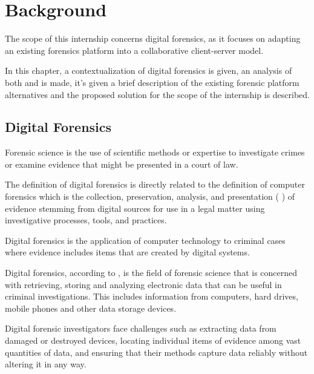 
\chapter{Background}
\label{ch:background}

The scope of this internship concerns digital forensics, as it focuses on adapting an existing forensics platform into a collaborative client-server model.

In this chapter, a contextualization of digital forensics is given, an analysis of both  \cite{sleuthkit} and  \cite{autopsy} is made, it's given a brief description of
the existing forensic platform alternatives and the proposed solution for the scope of the internship is described.

\section{Digital Forensics}

Forensic science is the use of scientific methods or expertise to investigate crimes
or examine evidence that might be presented in a court of law.

The definition of digital forensics is directly related to the definition of
computer forensics which is the collection, preservation, analysis,
and presentation ( \cite{daniels}) of evidence stemming from digital sources for use in a legal matter
using investigative processes, tools, and practices.

Digital forensics is the application of computer technology to criminal cases where evidence
includes items that are created by digital systems.

Digital forensics, according to \citeauthor{nist} \cite{nist}, is the field of forensic science that is concerned with retrieving,
storing and analyzing electronic data that can be useful in criminal investigations.
This includes information from computers, hard drives, mobile phones and other data
storage devices.

Digital forensic investigators face challenges such as extracting data from damaged or destroyed
devices, locating individual items of evidence among vast quantities of data,
and ensuring that their methods capture data reliably without altering it in any way.

